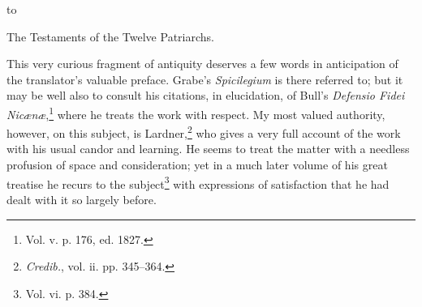 
to

The Testaments of the Twelve Patriarchs.

This very curious fragment of antiquity deserves a few words in anticipation of the translator’s valuable preface. Grabe’s \emph{Spicilegium} is there referred to; but it may be well also to consult his citations, in elucidation, of Bull’s \emph{Defensio Fidei Nicænæ},\footnote{Vol. v. p. 176, ed. 1827.} where he treats the work with respect. My most valued authority, however, on this subject, is Lardner,\footnote{\emph{Credib.}, vol. ii. pp. 345–364.} who gives a very full account of the work with his usual candor and learning. He seems to treat the matter with a needless profusion of space and consideration; yet in a much later volume of his great treatise he recurs to the subject\footnote{Vol. vi. p. 384.} with expressions of satisfaction that he had dealt with it so largely before.

